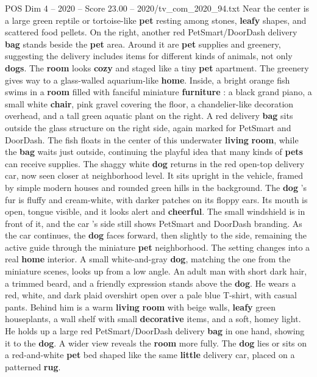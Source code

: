 \begin{textsample}{POS Dim 4 – 2020 – Score 23.00 – 2020/tv\_com\_2020\_94.txt}
Near the center is a large green reptile or tortoise-like \textbf{pet} resting among stones, \textbf{leafy} shapes, and scattered food pellets.
On the right, another red PetSmart/DoorDash delivery \textbf{bag} stands beside the \textbf{pet} area.
Around it are \textbf{pet} supplies and greenery, suggesting the delivery includes items for different kinds of animals, not only \textbf{dogs}.
The \textbf{room} looks \textbf{cozy} and staged like a tiny \textbf{pet} apartment.
The greenery gives way to a glass-walled aquarium-like \textbf{home}.
Inside, a bright orange fish swims in a \textbf{room} filled with fanciful miniature \textbf{furniture} : a black grand piano, a small white \textbf{chair}, pink gravel covering the floor, a chandelier-like decoration overhead, and a tall green aquatic plant on the right.
A red delivery \textbf{bag} sits outside the glass structure on the right side, again marked for PetSmart and DoorDash.
The fish floats in the center of this underwater \textbf{living} \textbf{room}, while the \textbf{bag} waits just outside, continuing the playful idea that many kinds of \textbf{pets} can receive supplies.
The shaggy white \textbf{dog} returns in the red open-top delivery car, now seen closer at neighborhood level.
It sits upright in the vehicle, framed by simple modern houses and rounded green hills in the background.
The \textbf{dog} ’s fur is fluffy and cream-white, with darker patches on its floppy ears.
Its mouth is open, tongue visible, and it looks alert and \textbf{cheerful}.
The small windshield is in front of it, and the car ’s side still shows PetSmart and DoorDash branding.
As the car continues, the \textbf{dog} faces forward, then slightly to the side, remaining the active guide through the miniature \textbf{pet} neighborhood.
The setting changes into a real \textbf{home} interior.
A small white-and-gray \textbf{dog}, matching the one from the miniature scenes, looks up from a low angle.
An adult man with short dark hair, a trimmed beard, and a friendly expression stands above the \textbf{dog}.
He wears a red, white, and dark plaid overshirt open over a pale blue T-shirt, with casual pants.
Behind him is a warm \textbf{living} \textbf{room} with beige walls, \textbf{leafy} green houseplants, a wall shelf with small \textbf{decorative} items, and a soft, homey light.
He holds up a large red PetSmart/DoorDash delivery \textbf{bag} in one hand, showing it to the \textbf{dog}.
A wider view reveals the \textbf{room} more fully.
The \textbf{dog} lies or sits on a red-and-white \textbf{pet} bed shaped like the same \textbf{little} delivery car, placed on a patterned \textbf{rug}.

\end{textsample}
